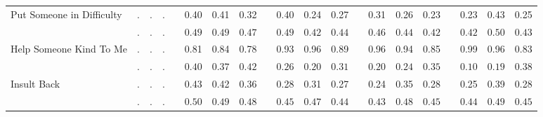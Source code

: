 \begin{landscape}
\begin{center}
{\begin{longtable}{L{5cm} c c c p{.5cm} c c c p{.5cm} c c c p{.5cm} c c c p{.5cm} c c c}
Put Someone in Difficulty & . &         . &         . & &      0.40 &      0.41 &      0.32 & &      0.40 &      0.24 &      0.27 & &      0.31 &      0.26 &      0.23 & &      0.23 &      0.43 &      0.25 \\*
& $\mathit{        .}$ & $\mathit{        .}$ & $\mathit{        .}$ & & $\mathit{     0.49}$ & $\mathit{     0.49}$ & $\mathit{     0.47}$ & & $\mathit{     0.49}$ & $\mathit{     0.42}$ & $\mathit{     0.44}$ & & $\mathit{     0.46}$ & $\mathit{     0.44}$ & $\mathit{     0.42}$ & & $\mathit{     0.42}$ & $\mathit{     0.50}$ & $\mathit{     0.43}$ \\[1.6em]
Help Someone Kind To Me & . &         . &         . & &      0.81 &      0.84 &      0.78 & &      0.93 &      0.96 &      0.89 & &      0.96 &      0.94 &      0.85 & &      0.99 &      0.96 &      0.83 \\*
& $\mathit{        .}$ & $\mathit{        .}$ & $\mathit{        .}$ & & $\mathit{     0.40}$ & $\mathit{     0.37}$ & $\mathit{     0.42}$ & & $\mathit{     0.26}$ & $\mathit{     0.20}$ & $\mathit{     0.31}$ & & $\mathit{     0.20}$ & $\mathit{     0.24}$ & $\mathit{     0.35}$ & & $\mathit{     0.10}$ & $\mathit{     0.19}$ & $\mathit{     0.38}$ \\[1.6em]
Insult Back & . &         . &         . & &      0.43 &      0.42 &      0.36 & &      0.28 &      0.31 &      0.27 & &      0.24 &      0.35 &      0.28 & &      0.25 &      0.39 &      0.28 \\*
& $\mathit{        .}$ & $\mathit{        .}$ & $\mathit{        .}$ & & $\mathit{     0.50}$ & $\mathit{     0.49}$ & $\mathit{     0.48}$ & & $\mathit{     0.45}$ & $\mathit{     0.47}$ & $\mathit{     0.44}$ & & $\mathit{     0.43}$ & $\mathit{     0.48}$ & $\mathit{     0.45}$ & & $\mathit{     0.44}$ & $\mathit{     0.49}$ & $\mathit{     0.45}$ \\[1.6em]
\hline
\end{longtable}
}
\end{center}
\end{landscape}
